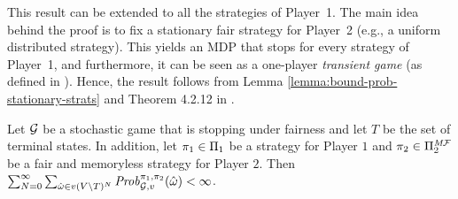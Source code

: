This result can be extended to all the strategies of Player~1. The
main idea behind the proof is to fix a stationary fair strategy for
Player~2 (e.g., a uniform distributed strategy).  This yields an MDP
that stops for every strategy of Player~1, and furthermore, it can be
seen as a one-player \emph{transient game} (as defined in
\cite{FilarV96}).  Hence, the result follows from Lemma
\ref{lemma:bound-prob-stationary-strats} and Theorem 4.2.12 in
\cite{FilarV96}.

\begin{theorem}\label{th:games-are-bounded}
  Let $\mathcal{G}$ be a stochastic game that is stopping under fairness
  and let $T$ be the set of terminal states.  In addition, let
  $\pi_{1} \in \Pi_{1}$ be a strategy for Player $1$ and
  $\pi_{2} \in \Pi^{\textit{M}\mathcal{F}}_{2}$ be a fair and memoryless
  strategy for Player $2$.  Then
  $\sum^\infty_{N=0} \sum_{\hat{\omega} \in v(V \setminus T)^N} \mathit{Prob}^{\pi_{1}, \pi_{2}}_{\mathcal{G},v}(\hat{\omega}) < \infty$.
\end{theorem}







